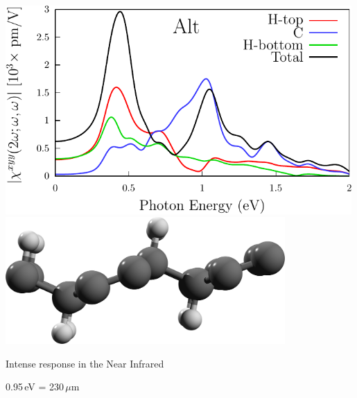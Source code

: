 \documentclass{beamer}
\begin{document}
\begin{frame}
\begin{columns}
\begin{center}
\includegraphics[width=0.99\textwidth]{figs/plots/shg-lay-alt.pdf}
\vspace{3mm}
\includegraphics[width=0.8\textwidth]{figs/alt2.png}

Intense response in the Near Infrared

0.95\,eV = 230\,$\mu$m

\end{center}


\end{columns}

\end{frame}





\end{document}
